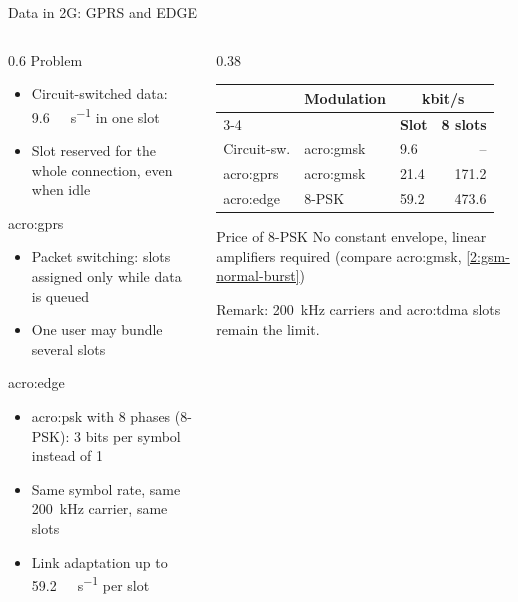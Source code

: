 \begin{frame}{Data in 2G: GPRS and EDGE}
  \begin{columns}[T,onlytextwidth]
    \begin{column}{0.6\textwidth}
      Problem
      \begin{itemize}
        \item Circuit-switched data: \qty{9.6}{\kilo\bit\per\second} in one slot
        \item Slot reserved for the whole connection, even when idle
      \end{itemize}
      \vspace{0.4em}
      \Gls{acro:gprs}
      \begin{itemize}
        \item Packet switching: slots assigned only while data is queued
        \item One user may bundle several slots
      \end{itemize}
      \vspace{0.4em}
      \Gls{acro:edge}
      \begin{itemize}
        \item \Gls{acro:psk} with 8 phases (8-PSK): 3 bits per symbol instead of 1~\cite{etsi.145.001.v18}
        \item Same symbol rate, same \qty{200}{\kilo\hertz} carrier, same slots
        \item Link adaptation up to \qty{59.2}{\kilo\bit\per\second} per slot
      \end{itemize}
    \end{column}
    \begin{column}{0.38\textwidth}
      \centering
      \footnotesize
      \begin{tabular}{lllr}
        \toprule
        & \textbf{Modulation} & \multicolumn{2}{c}{\textbf{kbit/s}} \\
        \cmidrule(l){3-4}
        & & \textbf{Slot} & \textbf{8 slots} \\
        \midrule
        Circuit-sw. & \acrshort{acro:gmsk} & 9.6 & -- \\
        \acrshort{acro:gprs} & \acrshort{acro:gmsk} & 21.4 & 171.2 \\
        \acrshort{acro:edge} & 8-PSK & 59.2 & 473.6 \\
        \bottomrule
      \end{tabular}

      \normalsize
      \raggedright
      \vspace{0.5em}
      \begin{block}{Price of 8-PSK}
        No constant envelope, linear amplifiers required (compare \gls{acro:gmsk}, \cref{2:gsm-normal-burst})
      \end{block}
      \alert{Remark:} \qty{200}{\kilo\hertz} carriers and \gls{acro:tdma} slots remain the limit.
    \end{column}
  \end{columns}
\end{frame}

